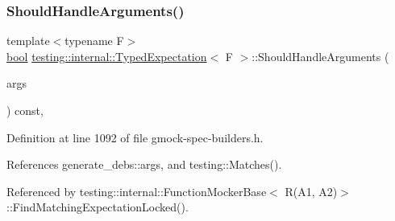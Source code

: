 \subsubsection{\texorpdfstring{Should\+Handle\+Arguments()}{ShouldHandleArguments()}}
{\footnotesize\ttfamily template$<$typename F$>$ \\
\hyperlink{classbool}{bool} \hyperlink{classtesting_1_1internal_1_1TypedExpectation}{testing\+::internal\+::\+Typed\+Expectation}$<$ F $>$\+::Should\+Handle\+Arguments (\begin{DoxyParamCaption}\item[{const \hyperlink{classtesting_1_1internal_1_1TypedExpectation_a9a91379262d101f435809ba4556d14fa}{Argument\+Tuple} \&}]{args }\end{DoxyParamCaption}) const\hspace{0.3cm}{\ttfamily [inline]}, {\ttfamily [private]}}



Definition at line 1092 of file gmock-\/spec-\/builders.\+h.



References generate\+\_\+debs\+::args, and testing\+::\+Matches().



Referenced by testing\+::internal\+::\+Function\+Mocker\+Base$<$ R(\+A1, A2)$>$\+::\+Find\+Matching\+Expectation\+Locked().


